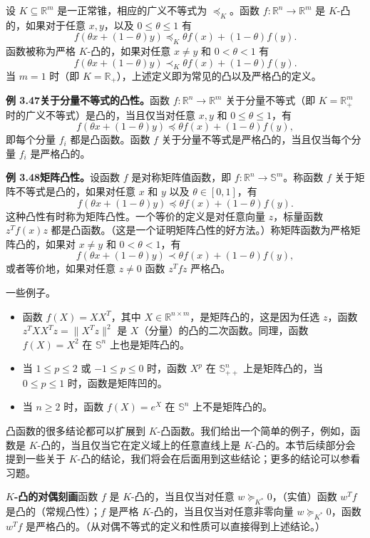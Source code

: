 \documentclass[UTF8, 12pt, fontset=fandol, oneside]{ctexart}
\begin{document}
设 $K\subseteq\mathbb{R}^m$ 是一正常锥，相应的广义不等式为 $\preceq_K$。函数 $f:\mathbb{R}^n\to\mathbb{R}^m$ 是 $K$-凸的，如果对于任意 $x,y$，以及 $0\leq\theta\leq1$ 有
\[
f(\theta x+(1-\theta)y)\preceq_K \theta f(x)+(1-\theta)f(y).
\]
函数被称为严格 $K$-凸的，如果对任意 $x\neq y$ 和 $0<\theta<1$ 有
\[
f(\theta x+(1-\theta)y)\prec_K \theta f(x)+(1-\theta)f(y).
\]
当 $m=1$ 时（即 $K=\mathbb{R}_+$），上述定义即为常见的凸以及严格凸的定义。

\noindent\textbf{例 3.47\quad 关于分量不等式的凸性。}\quad 函数 $f:\mathbb{R}^n\to\mathbb{R}^m$ 关于分量不等式（即 $K=\mathbb{R}_+^m$ 时的广义不等式）是凸的，当且仅当对任意 $x,y$ 和 $0\leq\theta\leq1$，有
\[
f(\theta x+(1-\theta)y)\preceq \theta f(x)+(1-\theta)f(y),
\]
即每个分量 $f_i$ 都是凸函数。函数 $f$ 关于分量不等式是严格凸的，当且仅当每个分量 $f_i$ 是严格凸的。

\noindent\textbf{例 3.48\quad 矩阵凸性。}\quad 设函数 $f$ 是对称矩阵值函数，即 $f:\mathbb{R}^n\to\mathbb{S}^m$。称函数 $f$ 关于矩阵不等式是凸的，如果对任意 $x$ 和 $y$ 以及 $\theta\in[0,1]$，有
\[
f(\theta x+(1-\theta)y)\preceq \theta f(x)+(1-\theta)f(y).
\]
这种凸性有时称为矩阵凸性。一个等价的定义是对任意向量 $z$，标量函数 $z^Tf(x)z$ 都是凸函数。（这是一个证明矩阵凸性的好方法。）称矩阵函数为严格矩阵凸的，如果对 $x\neq y$ 和 $0<\theta<1$，有
\[
f(\theta x+(1-\theta)y)\prec \theta f(x)+(1-\theta)f(y),
\]
或者等价地，如果对任意 $z\neq0$ 函数 $z^Tfz$ 严格凸。

一些例子。
\begin{itemize}
\item 函数 $f(X)=XX^T$，其中 $X\in\mathbb{R}^{n\times m}$，是矩阵凸的，这是因为任选 $z$，函数 $z^TXX^Tz=\|X^Tz\|^2$ 是 $X$（分量）的凸的二次函数。同理，函数 $f(X)=X^2$ 在 $\mathbb{S}^n$ 上也是矩阵凸的。
\item 当 $1\leq p\leq2$ 或 $-1\leq p\leq0$ 时，函数 $X^p$ 在 $\mathbb{S}_{++}^n$ 上是矩阵凸的，当 $0\leq p\leq1$ 时，函数是矩阵凹的。
\item 当 $n\geq2$ 时，函数 $f(X)=e^X$ 在 $\mathbb{S}^n$ 上不是矩阵凸的。
\end{itemize}

凸函数的很多结论都可以扩展到 $K$-凸函数。我们给出一个简单的例子，例如，函数是 $K$-凸的，当且仅当它在定义域上的任意直线上是 $K$-凸的。本节后续部分会提到一些关于 $K$-凸的结论，我们将会在后面用到这些结论；更多的结论可以参看习题。

\noindent\textbf{$K$-凸的对偶刻画}\quad 函数 $f$ 是 $K$-凸的，当且仅当对任意 $w\succeq_{K^*}0$，（实值）函数 $w^Tf$ 是凸的（常规凸性）；$f$ 是严格 $K$-凸的，当且仅当对任意非零向量 $w\succeq_{K^*}0$，函数 $w^Tf$ 是严格凸的。（从对偶不等式的定义和性质可以直接得到上述结论。）
\end{document}
